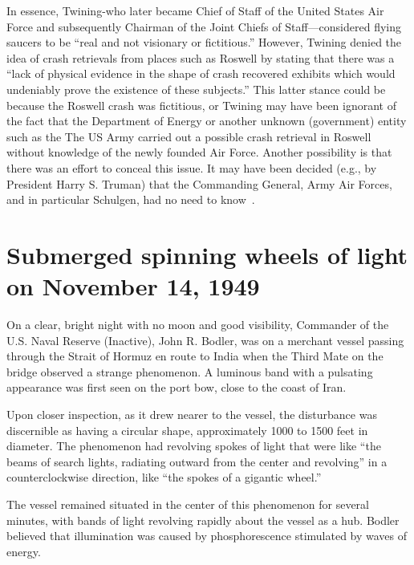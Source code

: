 In essence, Twining-who later became Chief of Staff of the United States Air Force and subsequently Chairman of the Joint Chiefs of
Staff---considered flying saucers to be ``real and not visionary or fictitious.''
However, Twining denied the idea of crash retrievals from places such as Roswell by stating that there was a
``lack of physical evidence in the shape of crash recovered exhibits which would undeniably prove the existence of these subjects.''
This latter stance could be because the Roswell crash was fictitious,
or Twining may have been ignorant of the fact that the Department of Energy or another unknown (government) entity such as the
The US Army carried out a possible crash retrieval in Roswell without knowledge of the newly founded Air Force. Another possibility is that there was an effort to conceal this issue. It may have been decided (e.g., by President Harry S. Truman) that the Commanding General, Army Air Forces, and in particular Schulgen, had no need to know~\cite[p.~44]{Dolan2002Jun}.


\section{Submerged spinning wheels of light on November 14, 1949}

\label{2023-UFO-part-History-chapter-post-1945-pre-1953-sswl}

On a clear, bright night with no moon and good visibility, Commander of the U.S. Naval Reserve (Inactive), John R. Bodler, was on a merchant vessel passing through the Strait of Hormuz en route to India when the Third Mate on the bridge observed a strange phenomenon. A luminous band with a pulsating appearance was first seen on the port bow, close to the coast of Iran.

Upon closer inspection, as it drew nearer to the vessel, the disturbance was discernible as having a circular shape, approximately 1000 to 1500 feet in diameter.
The phenomenon had revolving spokes of light that were like ``the beams of search lights, radiating outward from the center and revolving'' in a counterclockwise direction, like ``the spokes of a gigantic wheel.''

The vessel remained situated in the center of this phenomenon for several minutes, with bands of light revolving rapidly about the vessel as a hub. Bodler believed that illumination was caused by phosphorescence stimulated by waves of energy.

